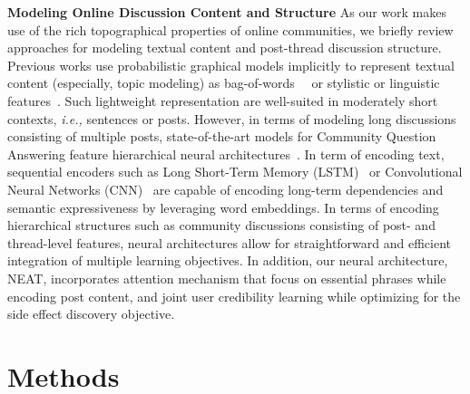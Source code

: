 \documentclass{bmcart}
\begin{document}
{\bf Modeling Online Discussion Content and Structure}
As our work makes use of the rich topographical properties of online communities, 
we briefly review approaches for modeling textual content and post-thread discussion structure. 
Previous works use probabilistic graphical models implicitly to represent textual content (especially, topic modeling) as bag-of-words~\cite{yates2015extracting}~\cite{wang2014sideeffectptm} or stylistic or linguistic features~\cite{mukherjee2014people}.
Such lightweight representation are well-suited in moderately short contexts, \textit{i.e.,} sentences or posts. However, in terms of modeling long discussions consisting of multiple posts, state-of-the-art models for
Community Question Answering feature hierarchical neural architectures~\cite{qiu2015convolutional,zhou2018recurrent,zhang2017attentive}. In term of encoding text, sequential encoders such as 
Long Short-Term Memory (LSTM)~\cite{hochreiter1997long} or Convolutional Neural Networks (CNN)~\cite{kim2014convolutional} are capable of encoding long-term dependencies and semantic expressiveness by leveraging word embeddings. In terms of encoding hierarchical structures such as community discussions consisting of post- and thread-level features, neural architectures allow for straightforward and efficient integration of multiple learning objectives. In addition, our neural architecture, NEAT, incorporates attention mechanism that focus on essential phrases while encoding post content, and joint user credibility learning while optimizing for the side effect discovery objective.

\section{Methods}\label{sec:proposed_method}
\end{document}
